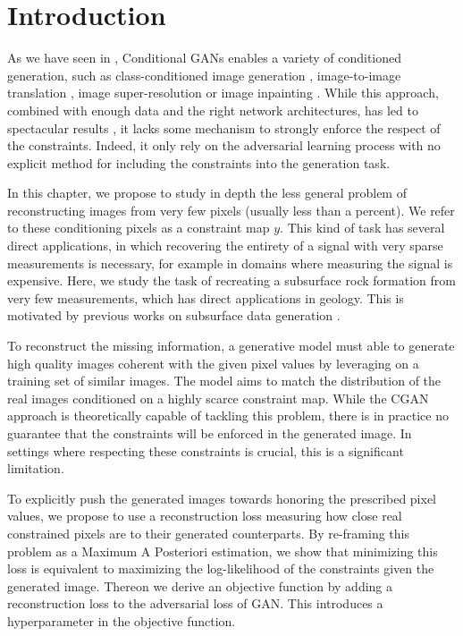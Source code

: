 \newpage
\minitoc

\section{Introduction}

As we have seen in , Conditional GANs enables a variety of conditioned generation, such as class-conditioned image generation \citep{Mirza2014}, image-to-image translation \citep{Isola2016, Wang2018}, image super-resolution \citep{Wang2020} or image inpainting \citep{Pathak2016}. While this approach, combined with enough data and the right network architectures, has led to spectacular results \citep{Karras2020}, it lacks some mechanism to strongly enforce the respect of the constraints. Indeed, it only rely on the adversarial learning process with no explicit method for including the constraints into the generation task.

In this chapter,  we propose to study in depth the less general problem of reconstructing images from very few pixels (usually less than a percent). We refer to these conditioning pixels as a constraint map $y$. This kind of task has several direct applications, in which recovering the entirety of a signal with very sparse measurements is necessary, for example in domains where measuring the signal is expensive. Here, we study the task of recreating a subsurface rock formation from very few measurements, which has direct applications in geology. This is motivated by previous works on subsurface data generation \citep{Laloy2018, Laloy2019}.

To reconstruct the missing information, a generative  model must able to generate high quality images coherent with the given pixel values by leveraging on a training set of similar images. The model aims to match the distribution of the real images conditioned on a highly scarce constraint map. While the \ac{CGAN} approach is theoretically capable of tackling this problem, there is in practice no guarantee that the constraints will be enforced in the generated image. In settings where respecting these constraints is crucial, this is a significant limitation.

To explicitly push the generated images towards honoring the prescribed pixel values, we propose to use a reconstruction loss measuring how close real constrained pixels are to their generated counterparts.  By re-framing this problem as a Maximum A Posteriori estimation, we show that minimizing this loss is equivalent to maximizing the log-likelihood of the constraints given the generated image. Thereon we derive an objective function by adding a reconstruction loss to the adversarial loss of \ac{GAN}. This introduces a hyperparameter in the objective function.

